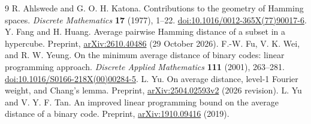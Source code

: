 \documentclass[11pt]{article}
\begin{document}
\begin{thebibliography}{9}
 R. Ahlswede and G. O. H. Katona. Contributions to the geometry of Hamming spaces. \emph{Discrete Mathematics} \textbf{17} (1977), 1--22. \href{https://doi.org/10.1016/0012-365X(77)90017-6}{doi:10.1016/0012-365X(77)90017-6}.
 Y. Fang and H. Huang. Average pairwise Hamming distance of a subset in a hypercube. Preprint, \href{https://arxiv.org/abs/2610.40486}{arXiv:2610.40486} (29 October 2026).
 F.-W. Fu, V. K. Wei, and R. W. Yeung. On the minimum average distance of binary codes: linear programming approach. \emph{Discrete Applied Mathematics} \textbf{111} (2001), 263--281. \href{https://doi.org/10.1016/S0166-218X(00)00284-5}{doi:10.1016/S0166-218X(00)00284-5}.
 L. Yu. On average distance, level-1 Fourier weight, and Chang's lemma. Preprint, \href{https://arxiv.org/abs/2504.02593v2}{arXiv:2504.02593v2} (2026 revision).
 L. Yu and V. Y. F. Tan. An improved linear programming bound on the average distance of a binary code. Preprint, \href{https://arxiv.org/abs/1910.09416}{arXiv:1910.09416} (2019).
\end{thebibliography}
\end{document}

